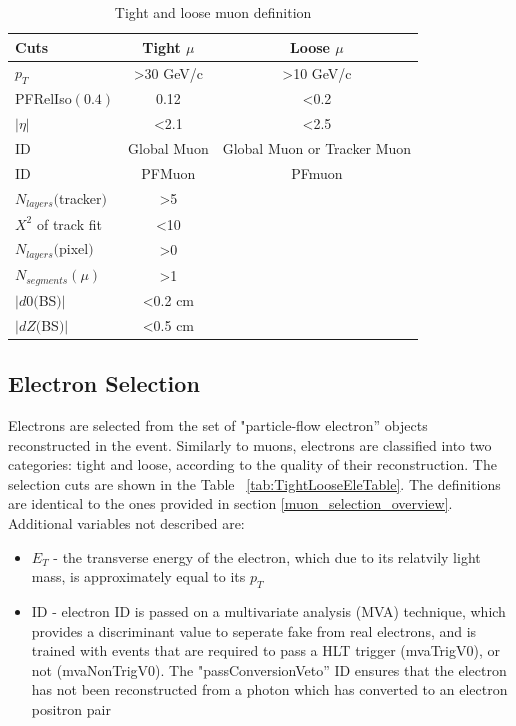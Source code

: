\begin{table}[hbtp]\footnotesize
\centering
\begin{tabular}{|l|c|c|}
\hline\hline
Cuts & Tight $\mu$ & Loose $\mu$ \\
\hline
$p_{T}$ & \textgreater 30 GeV/c & \textgreater 10 GeV/c \\
\hline
PFRelIso$(0.4)$ & 0.12  & \textless 0.2 \\
\hline
$|\eta|$ & \textless 2.1 & \textless 2.5 \\
\hline
ID & Global Muon & Global Muon or Tracker Muon \\
\hline
ID & PFMuon & PFmuon \\
\hline
$N_{layers}($tracker$)$ & \textgreater 5 & \\
\hline
${X}^2$ of track fit & \textless 10 & \\
\hline
$N_{layers}($pixel$)$ & \textgreater 0 & \\
\hline
$N_{segments}(\mu)$ & \textgreater 1 & \\
\hline
$|d0($BS$)|$ & \textless 0.2 cm & \\
\hline
$|dZ($BS$)|$ & \textless 0.5 cm & \\
\hline\hline
\end{tabular}
\caption{Tight and loose muon definition}
\label{tab:TightLooseMuTable}
\end{table}



\subsection{Electron Selection}
\label{electron_selection_overview}

\par Electrons are selected from the set of "particle-flow electron''
objects reconstructed in the event.  Similarly to muons, electrons are
classified into two categories: tight and loose, according to the
quality of their reconstruction.  The selection cuts are shown in the
Table ~\ref{tab:TightLooseEleTable}.  The definitions are identical to
the ones provided in section \ref{muon_selection_overview}.
Additional variables not described are:

\begin{itemize}
  \item $E_{T}$ - the transverse energy of the electron, which due to
    its relatvily light mass, is approximately equal to its $p_{T}$
  \item ID - electron ID is passed on a multivariate analysis (MVA)
  technique, which provides a discriminant value to seperate fake from
  real electrons, and is trained with events that are required to pass
  a HLT trigger (mvaTrigV0), or not (mvaNonTrigV0).  The
  "passConversionVeto'' ID ensures that the electron has not been
  reconstructed from a photon which has converted to an electron
  positron pair
\end{itemize}

